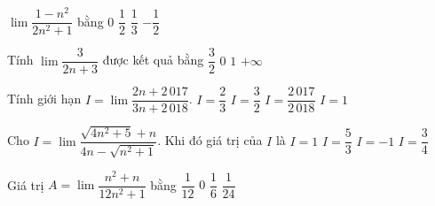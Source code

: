 

\begin{ex}%
	 $\lim\dfrac{1-n^2}{2n^2+1}$ bằng
	 \choice
		 {$0$}
		{$\dfrac{1}{2}$} 
		 {$\dfrac{1}{3}$}
		 {\True $-\dfrac{1}{2}$}
\end{ex}

\begin{ex}%
	Tính $\lim\dfrac{3}{2n+3}$ được kết  quả bằng
	\choice 
		 {$\dfrac{3}{2}$}
		 {\True $0$}
		{$1$} 
		 {$+\infty$}
\end{ex}

\begin{ex}%
	 Tính giới hạn $I=\lim\dfrac{2n+2\,017}{3n+2\,018}$.
	 \choice
		{\True  $I=\dfrac{2}{3}$}
		{$I=\dfrac{3}{2}$} 
		{$I=\dfrac{2\,017}{2\,018}$} 
		{$I=1$} 
\end{ex}

\begin{ex}%
	Cho $I=\lim\dfrac{\sqrt{4n^2+5}+n}{4n-\sqrt{n^2+1}}$.  Khi đó giá trị của $I$ là
	 \choice
		 {\True $I=1$}
		 {$I=\dfrac{5}{3}$}
		 {$I=-1$}
		{$I=\dfrac{3}{4}$} 
\end{ex}

\begin{ex}%
	Giá trị $ A=\lim\dfrac{n^2+n}{12n^2+1}$  bằng
	\choice 
		{\True $\dfrac{1}{12}$} 
		 {$0$}
		 {$\dfrac{1}{6}$}
		 {$\dfrac{1}{24}$}
\end{ex}

